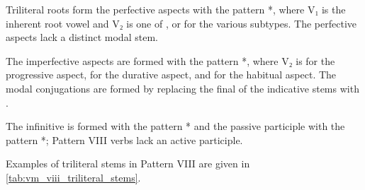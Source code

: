 \documentclass[grammar]{subfiles}
\begin{document}
Triliteral roots form the perfective aspects with the pattern *,
where V₁ is the inherent root vowel and V₂ is one of ,  or 
for the various subtypes.  The perfective aspects lack a distinct modal stem. 

The imperfective aspects are formed with the pattern *, where
V₂ is  for the progressive aspect,  for the durative aspect, and
 for the habitual aspect.  The modal conjugations are formed by
replacing the final  of the indicative stems with . 

The infinitive is formed with the pattern * and the passive
participle with the pattern *; Pattern VIII verbs lack an active
participle.  

Examples of triliteral stems in Pattern VIII are given in \cref{tab:vm_viii_triliteral_stems}. 

\begin{table}[h!]\small\capstart
  \centering
  \\
  \caption{Pattern VIII triliteral stems \label{tab:vm_viii_triliteral_stems}}
\end{table}
\end{document}
